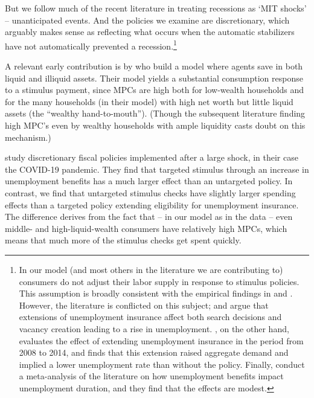 \documentclass[\econtexRoot/HAFiscal]{subfiles}
\begin{document}
But we follow much of the recent literature in treating recessions as `MIT shocks' -- unanticipated events. And the policies we examine are discretionary, which arguably makes sense as reflecting what occurs when the automatic stabilizers have not automatically prevented a recession.\footnote{
  In our model (and most others in the literature we are contributing to) consumers do not adjust their labor supply in response to stimulus policies. %
  This assumption is broadly consistent with the empirical findings in \cite{ganong2022spending} and \cite{chodorow2016limited}.
  However, the literature is conflicted on this subject; \cite{hagedorn2017impact} and \cite{hagedorn2019unemployment} argue that extensions of unemployment insurance affect both search decisions and vacancy creation leading to a rise in unemployment. 
\cite{kekre2022unemp}, on the other hand, evaluates the effect of extending unemployment insurance in the period from 2008 to 2014, and finds that this extension raised aggregate demand and implied a lower unemployment rate than without the policy. 
Finally, \cite{cohenDisemployment} conduct a meta-analysis of the literature on how unemployment benefits impact unemployment duration, and they find that the effects are modest.}

A relevant early contribution is by \cite{kaplan2014model} who build a model where agents save in both liquid and illiquid assets. %
Their model yields a substantial consumption response to a stimulus payment, since MPCs are high both for low-wealth households and for the many households (in their model) with high net worth but little liquid assets (the ``wealthy hand-to-mouth'').  (Though the subsequent literature finding high MPC's even by wealthy households with ample liquidity casts doubt on this mechanism.)

\cite{bayercoronavirus} study discretionary fiscal policies implemented after a large shock, in their case the COVID-19 pandemic. %
They find that targeted stimulus through an increase in unemployment benefits has a much larger effect than an untargeted policy.
In contrast, we find that untargeted stimulus checks have slightly larger spending effects than a targeted policy extending eligibility for unemployment insurance. %
The difference derives from the fact that -- in our model as in the data -- even middle- and high-liquid-wealth consumers have relatively high MPCs, which means that much more of the stimulus checks get spent quickly.
\end{document}
